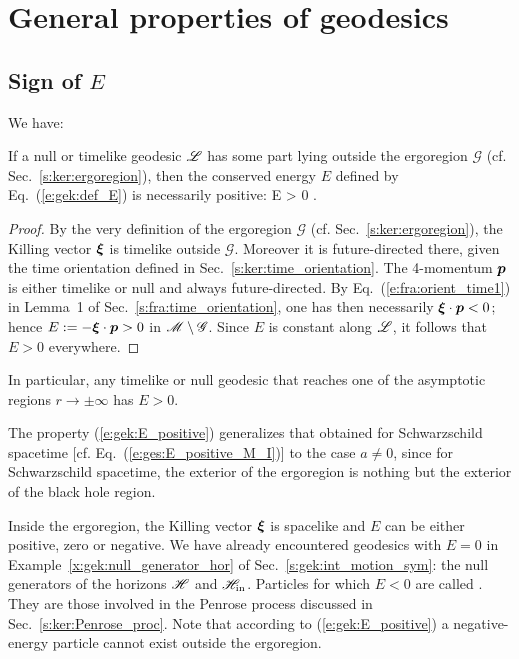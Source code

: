 \section{General properties of geodesics}

\subsection{Sign of $E$} \label{s:gek:sign_E}

We have:
\begin{greybox}
If a null or timelike geodesic $\mathscr{L}$ has some part lying outside the ergoregion $\mathscr{G}$ (cf. Sec.~\ref{s:ker:ergoregion}),
then the conserved energy $E$ defined by Eq.~(\ref{e:gek:def_E}) is necessarily positive:
\be \label{e:gek:E_positive}
    \Li \not\subset {}\quad \Longrightarrow \quad E > 0 .
\ee
\end{greybox}
\begin{proof}
By the very definition of the ergoregion $\mathscr{G}$ (cf. Sec.~\ref{s:ker:ergoregion}),
the Killing vector $\bm{\xi}$ is timelike outside $\mathscr{G}$. Moreover it is
future-directed there, given the time orientation defined in Sec.~\ref{s:ker:time_orientation}.
The 4-momentum $\bm{p}$ is either timelike or null and always future-directed.
By Eq.~(\ref{e:fra:orient_time1}) in Lemma~1 of Sec.~\ref{s:fra:time_orientation}, one has then necessarily $\bm{\xi}\cdot\bm{p} < 0$; hence
$E := - \bm{\xi}\cdot\bm{p} > 0$ in $\mathscr{M}\setminus \mathscr{G}$. Since $E$ is constant along $\mathscr{L}$, it
follows that $E > 0$ everywhere.
\end{proof}
In particular, any timelike or null geodesic that reaches one of the asymptotic regions
$r\to\pm\infty$ has $E>0$.
\begin{remark}
The property (\ref{e:gek:E_positive}) generalizes that obtained for Schwarzschild spacetime [cf. Eq.~(\ref{e:ges:E_positive_M_I})] to
the case $a\not=0$, since for Schwarzschild spacetime, the exterior of the ergoregion
is nothing but the exterior of the black hole region.
\end{remark}

Inside the ergoregion, the Killing vector $\bm{\xi}$ is spacelike and $E$ can be
either positive, zero or negative.
We have already encountered geodesics with $E=0$ in Example~\ref{x:gek:null_generator_hor} of Sec.~\ref{s:gek:int_motion_sym}: the null generators of the horizons $\mathscr{H}$
and $\mathscr{H}_{\rm in}$.
Particles for which $E<0$ are called
. They are those involved in the Penrose process discussed in Sec.~\ref{s:ker:Penrose_proc}.
Note that according to (\ref{e:gek:E_positive}) a negative-energy particle cannot exist
outside the ergoregion.

